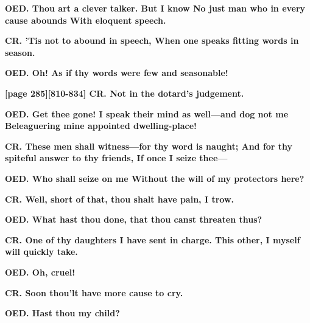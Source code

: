 \documentclass[11pt,letter]{book}
\begin{document}
\par \textbf{OED. Thou art a clever talker. But I know No just man who in every cause abounds With eloquent speech.}
\par 

\par \textbf{CR. ’Tis not to abound in speech, When one speaks fitting words in season.}
\par 

\par \textbf{OED. Oh! As if thy words were few and seasonable!}
\par 

\par \textbf{[page 285][810-834] CR. Not in the dotard’s judgement.}
\par 

\par \textbf{OED. Get thee gone! I speak their mind as well—and dog not me Beleaguering mine appointed dwelling-place!}
\par 

\par \textbf{CR. These men shall witness—for thy word is naught; And for thy spiteful answer to thy friends, If once I seize thee—}
\par 

\par \textbf{OED. Who shall seize on me Without the will of my protectors here?}
\par 

\par \textbf{CR. Well, short of that, thou shalt have pain, I trow.}
\par 

\par \textbf{OED. What hast thou done, that thou canst threaten thus?}
\par 

\par \textbf{CR. One of thy daughters I have sent in charge. This other, I myself will quickly take.}
\par 

\par \textbf{OED. Oh, cruel!}
\par 

\par \textbf{CR. Soon thou’lt have more cause to cry.}
\par 

\par \textbf{OED. Hast thou my child?}
\par 
\end{document}
